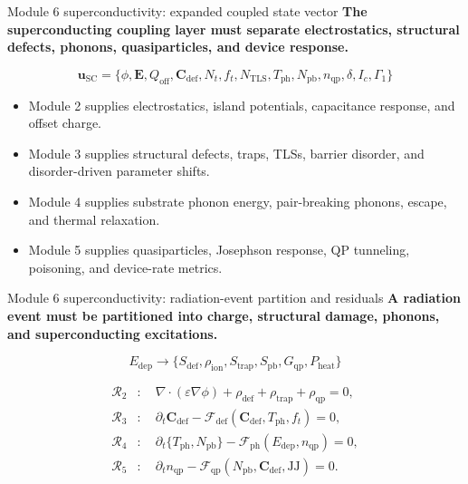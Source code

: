 \documentclass[aspectratio=169,10pt]{beamer}
\begin{document}
\begin{frame}{Module 6 superconductivity: expanded coupled state vector}
\small
\textbf{The superconducting coupling layer must separate electrostatics, structural defects, phonons, quasiparticles, and device response.}

\vspace{0.1em}
\begin{equation*}
\boxed{
\mathbf u_{\mathrm{SC}}
=\{\phi,\mathbf E,Q_{\mathrm{off}},\mathbf C_{\mathrm{def}},N_t,f_t,N_{\mathrm{TLS}},T_{\mathrm{ph}},N_{\mathrm{pb}},n_{\mathrm{qp}},\delta,I_c,\Gamma_1\}
}
\end{equation*}

\vspace{-0.15em}
\begin{itemize}
    \item Module 2 supplies electrostatics, island potentials, capacitance response, and offset charge.
    \item Module 3 supplies structural defects, traps, TLSs, barrier disorder, and disorder-driven parameter shifts.
    \item Module 4 supplies substrate phonon energy, pair-breaking phonons, escape, and thermal relaxation.
    \item Module 5 supplies quasiparticles, Josephson response, QP tunneling, poisoning, and device-rate metrics.
\end{itemize}
\end{frame}

\begin{frame}{Module 6 superconductivity: radiation-event partition and residuals}
\footnotesize
\textbf{A radiation event must be partitioned into charge, structural damage, phonons, and superconducting excitations.}

\vspace{-0.15em}
\begin{equation*}
\boxed{
E_{\mathrm{dep}}
\rightarrow
\{S_{\mathrm{def}},\rho_{\mathrm{ion}},S_{\mathrm{trap}},S_{\mathrm{pb}},G_{\mathrm{qp}},P_{\mathrm{heat}}\}
}
\end{equation*}

\vspace{-0.15em}
\begin{align*}
\mathcal R_2&:\quad \nabla\cdot(\varepsilon\nabla\phi)+\rho_{\mathrm{def}}+\rho_{\mathrm{trap}}+\rho_{\mathrm{qp}}=0,\\[-0.05em]
\mathcal R_3&:\quad \partial_t\mathbf C_{\mathrm{def}}-\mathcal F_{\mathrm{def}}(\mathbf C_{\mathrm{def}},T_{\mathrm{ph}},f_t)=0,\\[-0.05em]
\mathcal R_4&:\quad \partial_t\{T_{\mathrm{ph}},N_{\mathrm{pb}}\}-\mathcal F_{\mathrm{ph}}(E_{\mathrm{dep}},n_{\mathrm{qp}})=0,\\[-0.05em]
\mathcal R_5&:\quad \partial_t n_{\mathrm{qp}}-\mathcal F_{\mathrm{qp}}(N_{\mathrm{pb}},\mathbf C_{\mathrm{def}},\mathrm{JJ})=0.
\end{align*}
\end{frame}
\end{document}
